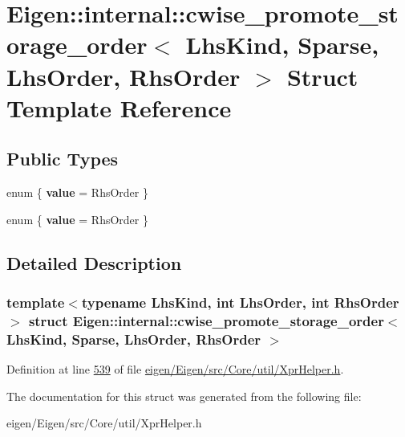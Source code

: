 \hypertarget{struct_eigen_1_1internal_1_1cwise__promote__storage__order_3_01_lhs_kind_00_01_sparse_00_01_lhs_order_00_01_rhs_order_01_4}{}\section{Eigen\+:\+:internal\+:\+:cwise\+\_\+promote\+\_\+storage\+\_\+order$<$ Lhs\+Kind, Sparse, Lhs\+Order, Rhs\+Order $>$ Struct Template Reference}
\label{struct_eigen_1_1internal_1_1cwise__promote__storage__order_3_01_lhs_kind_00_01_sparse_00_01_lhs_order_00_01_rhs_order_01_4}
\subsection*{Public Types}
\begin{DoxyCompactItemize}
\item 
\mbox{\label{struct_eigen_1_1internal_1_1cwise__promote__storage__order_3_01_lhs_kind_00_01_sparse_00_01_lhs_order_00_01_rhs_order_01_4_a863b080b774fb81b58bf03362b0bd80f}} 
enum \{ {\bfseries value} = Rhs\+Order
 \}
\item 
\mbox{\label{struct_eigen_1_1internal_1_1cwise__promote__storage__order_3_01_lhs_kind_00_01_sparse_00_01_lhs_order_00_01_rhs_order_01_4_a98afbce4599b69e38f375a574c0e85bc}} 
enum \{ {\bfseries value} = Rhs\+Order
 \}
\end{DoxyCompactItemize}


\subsection{Detailed Description}
\subsubsection*{template$<$typename Lhs\+Kind, int Lhs\+Order, int Rhs\+Order$>$\newline
struct Eigen\+::internal\+::cwise\+\_\+promote\+\_\+storage\+\_\+order$<$ Lhs\+Kind, Sparse, Lhs\+Order, Rhs\+Order $>$}



Definition at line \hyperlink{eigen_2_eigen_2src_2_core_2util_2_xpr_helper_8h_source_l00539}{539} of file \hyperlink{eigen_2_eigen_2src_2_core_2util_2_xpr_helper_8h_source}{eigen/\+Eigen/src/\+Core/util/\+Xpr\+Helper.\+h}.



The documentation for this struct was generated from the following file\+:\begin{DoxyCompactItemize}
\item 
eigen/\+Eigen/src/\+Core/util/\+Xpr\+Helper.\+h\end{DoxyCompactItemize}
